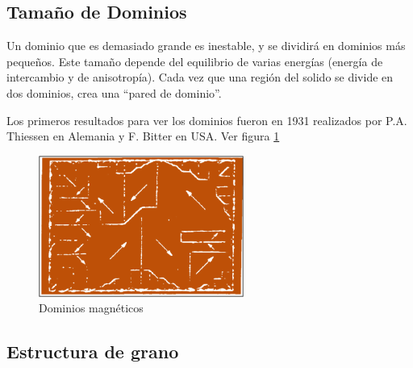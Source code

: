 \subsection{Tamaño de Dominios}

	Un dominio que es demasiado grande es inestable, y se dividirá en dominios más pequeños. Este tamaño depende del equilibrio de varias energías (energía de intercambio y de anisotropía). Cada vez que una región del solido se divide en dos dominios, crea una “pared de dominio”.
	
Los primeros resultados para ver los dominios fueron en 1931 realizados por P.A. Thiessen en Alemania y F. Bitter en USA. Ver figura \ref{fig:dominioGrano1a}


\begin{figure}[H]
	\centering
    \includegraphics[width=0.60\textwidth]{./Figures/dominio_grano1}
    \caption{Dominios magnéticos}
    \label{fig:dominioGrano1a}
\end{figure}


\subsection{Estructura de grano}

